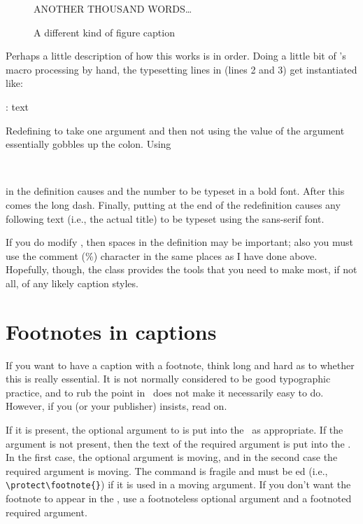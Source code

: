 \begin{lcode}
 \makeatletter
 \renewcommand{\fnum@figure}[1]{\textbf{\figurename~\thefigure} 
                                --- \sffamily}
 \makeatother
 \begin{figure}
  \centering
  ANOTHER THOUSAND WORDS\ldots
 \caption{A different kind of figure caption}\label{fig:sf}
 \end{figure}
\end{lcode}
 Perhaps a little description of how this works is in order.
 Doing a little bit of \tx's macro processing by hand, the typesetting
 lines in \cmd{\@makecaption} (lines 2 and 3) get instantiated like:
\begin{lcode}
\fnum@figure{\figurename~\thefigure}: text
\end{lcode}
 Redefining \cmd{\fnum@figure} to take one argument and then not using the
 value of the argument essentially gobbles up the colon. Using
\begin{lcode}
\textbf{\figurename~\thefigure}
\end{lcode}
in the definition causes \cmd{\figurename} and the number to be typeset in
a bold font. After this comes the long dash. Finally, putting \cmd{\sffamily}
at the end of the redefinition causes any following text (i.e., the actual 
title) to be typeset using the sans-serif font.

 If you do modify \cmd{\@makecaption}, then spaces in the definition may be
important; also you must use the comment (\%) character in the same
places as I have done above. Hopefully, though, the class provides the
tools that you need to make most, if not all, of any likely caption styles.

\makeatletter
\let\fnum@figure\oldfnum@figure
\makeatother



 \section{Footnotes in captions}


    If you want to have a caption with a footnote, think long and hard
 as to whether this is really essential. It is not normally considered
 to be good typographic practice, and to rub the point in \ltx\ does not
 make it necessarily easy to do. However, if you (or your publisher)
 insists, read on.

    If it is present, the optional argument to \cmd{\caption} is put into
the \listofx\ as appropriate. If the argument is not present, then the
text of the required argument is put into the \listofx. In the first case,
the optional argument is moving, and in the second case the required
argument is moving. The \cmd{\footnote} command 
is fragile and must be
\cmd{\protect}ed (i.e., \verb?\protect\footnote{}?) if it is used in a moving 
argument. If you don't want the footnote to appear in 
the \listofx, use a
footnoteless optional argument and a footnoted required argument.

